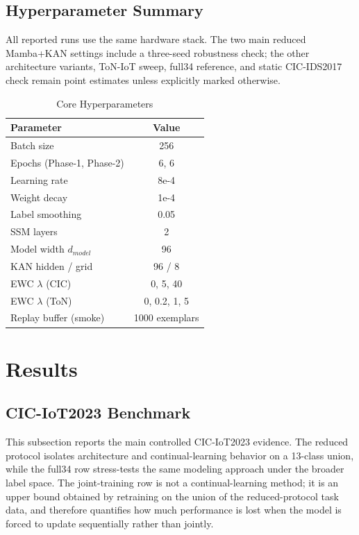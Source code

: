 \documentclass[a4paper,fleqn]{cas-dc}
\begin{document}
\subsection{Hyperparameter Summary}
All reported runs use the same hardware stack. The two main reduced Mamba+KAN settings include a three-seed robustness check; the other architecture variants, ToN-IoT sweep, full34 reference, and static CIC-IDS2017 check remain point estimates unless explicitly marked otherwise.

\begin{table}[htbp]
\caption{Core Hyperparameters}
\label{tab:hyp}
\centering
\begin{tabular}{lc}
\toprule
Parameter & Value \\
\midrule
Batch size & 256 \\
Epochs (Phase-1, Phase-2) & 6, 6 \\
Learning rate & 8e-4 \\
Weight decay & 1e-4 \\
Label smoothing & 0.05 \\
SSM layers & 2 \\
Model width $d_{model}$ & 96 \\
KAN hidden / grid & 96 / 8 \\
EWC $\lambda$ (CIC) & 0, 5, 40 \\
EWC $\lambda$ (ToN) & 0, 0.2, 1, 5 \\
Replay buffer (smoke) & 1000 exemplars \\
\bottomrule
\end{tabular}
\end{table}

\section{Results}
\subsection{CIC-IoT2023 Benchmark}
This subsection reports the main controlled CIC-IoT2023 evidence. The reduced protocol isolates architecture and continual-learning behavior on a 13-class union, while the full34 row stress-tests the same modeling approach under the broader label space. The joint-training row is not a continual-learning method; it is an upper bound obtained by retraining on the union of the reduced-protocol task data, and therefore quantifies how much performance is lost when the model is forced to update sequentially rather than jointly.
\end{document}
